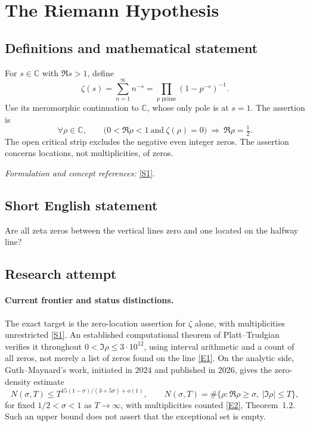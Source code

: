 \documentclass[11pt]{article}
\newcommand{\C}{\mathbb{C}}
\newcommand{\sref}[2]{\hyperlink{source:#1:#2}{[S#2]}}
\newcommand{\eref}[2]{\hyperlink{extra:#1:#2}{[E#2]}}
\newif\ifshowcatalogue
\newcommand{\cataloguescope}[1]{\ifshowcatalogue
 \paragraph{Exact scope in the supplied catalogue.}
 \begin{quote}\small #1\end{quote}\fi}
\begin{document}
\setcounter{section}{0}
\clearpage
\section*{\texorpdfstring{The Riemann Hypothesis}{The Riemann Hypothesis}}\label{2}
\subsection{Definitions and mathematical statement}
For $s\in\C$ with $\Re s>1$, define
\[
 \zeta(s)=\sum_{n=1}^{\infty}n^{-s}=\prod_{p\text{ prime}}(1-p^{-s})^{-1}.
\]
Use its meromorphic continuation to $\C$, whose only pole is at $s=1$. The assertion is
\[
 \forall\rho\in\C,\qquad \bigl(0<\Re\rho<1\ \text{and}\ \zeta(\rho)=0\bigr)
 \ \Longrightarrow\ \Re\rho=\tfrac12.
\]
The open critical strip excludes the negative even integer zeros. The assertion concerns locations, not multiplicities, of zeros.
\par\smallskip\textit{Formulation and concept references:} \sref{2}{1}.
\cataloguescope{For the meromorphic continuation of the Riemann zeta function zeta(s)=sum\_\{n>=1\} n\textasciicircum{}(-s), initially defined for Re(s)>1, every zero s in the open critical strip 0<Re(s)<1 has Re(s)=1/2. This is the Riemann Hypothesis for zeta alone; it does not assert simplicity of its zeros.}
\subsection{Short English statement}
Are all zeta zeros between the vertical lines zero and one located on the halfway line?
\subsection{Research attempt}

\paragraph{Current frontier and status distinctions.}
The exact target is the zero-location assertion for $\zeta$ alone, with
multiplicities unrestricted \sref{2}{1}. An established computational theorem
of Platt--Trudgian verifies it throughout $0<\Im\rho\le 3\cdot10^{12}$,
using interval arithmetic and a count of all zeros, not merely a list of zeros
found on the line \eref{2}{1}. On the analytic side, Guth--Maynard's work,
initiated in 2024 and published in 2026, gives the zero-density estimate
\[
 N(\sigma,T)\le T^{15(1-\sigma)/(3+5\sigma)+o(1)},
 \qquad N(\sigma,T)=\#\{\rho:\Re\rho\ge\sigma,\ |\Im\rho|\le T\},
\]
for fixed $1/2<\sigma<1$ as $T\to\infty$, with multiplicities counted
\eref{2}{2}, Theorem~1.2. Such an upper bound does
not assert that the exceptional set is empty.
\end{document}
